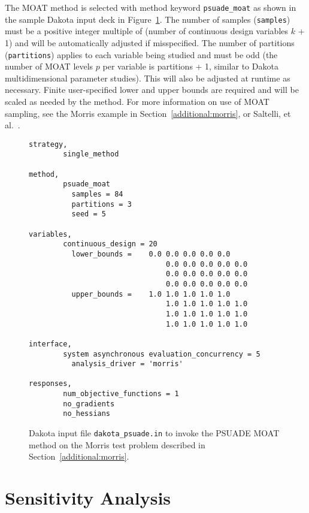 The MOAT method is selected with method keyword {\tt psuade\_moat} as
shown in the sample Dakota input deck in Figure~\ref{FIG:moat_input}.
The number of samples ({\tt samples}) must be a positive integer
multiple of (number of continuous design variables $k$ + 1) and will
be automatically adjusted if misspecified.  The number of partitions
({\tt partitions}) applies to each variable being studied and must be
odd (the number of MOAT levels $p$ per variable is partitions + 1,
similar to Dakota multidimensional parameter studies).  This will also
be adjusted at runtime as necessary.  Finite user-specified lower and
upper bounds are required and will be scaled as needed by the method.
For more information on use of MOAT sampling, see the Morris example
in Section~\ref{additional:morris}, or Saltelli, et al.~\cite{Sal04}.

\begin{figure}[ht!]
\centering
\begin{bigbox}
\begin{small}
\begin{verbatim}
strategy,
        single_method

method,
        psuade_moat
          samples = 84
          partitions = 3
          seed = 5

variables,
        continuous_design = 20
          lower_bounds =    0.0 0.0 0.0 0.0 0.0
                                0.0 0.0 0.0 0.0 0.0
                                0.0 0.0 0.0 0.0 0.0
                                0.0 0.0 0.0 0.0 0.0
          upper_bounds =    1.0 1.0 1.0 1.0 1.0
                                1.0 1.0 1.0 1.0 1.0
                                1.0 1.0 1.0 1.0 1.0
                                1.0 1.0 1.0 1.0 1.0

interface,
        system asynchronous evaluation_concurrency = 5
          analysis_driver = 'morris'

responses,
        num_objective_functions = 1
        no_gradients
        no_hessians
\end{verbatim}
\end{small}
\end{bigbox}
\caption[Dakota input file for PSUADE
MOAT.]{\label{FIG:moat_input}Dakota input file {\tt dakota\_psuade.in}
to invoke the PSUADE MOAT method on the Morris test problem described in
Section~\ref{additional:morris}.}
\end{figure}


\section{Sensitivity Analysis}\label{dace:sensitivity}


